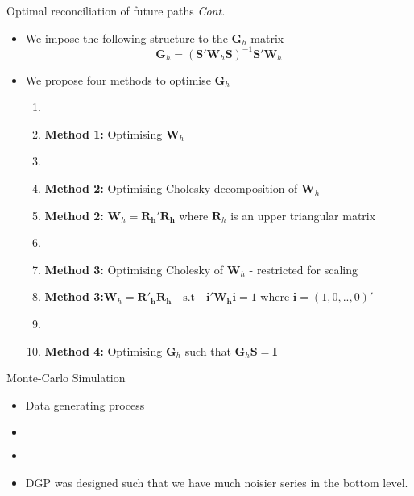 \documentclass[11pt,xcolor=dvipsnames,handout]{beamer}
\begin{document}
\begin{frame}{Optimal reconciliation of future paths \textit{Cont.}}
\begin{itemize}[<+-| alert@+>]
\item We impose the following structure to the $\bm{G}_h$ matrix
\begin{equation}\label{eq:2}
\bm{G}_h=\left(\bm{S}'\bm{W}_h\bm{S}\right)^{-1}{\bm S'}\bm{W}_h
\end{equation}
\item We propose four methods to optimise $\bm{G}_h$
\begin{enumerate}
\item[]
\item[] \textbf{\color{Maroon}Method 1:} Optimising $\bm{W}_h$
\item[] 
\item[] \textbf{\color{Maroon}Method 2:} Optimising Cholesky decomposition of $\bm{W}_h$
\item[] \textbf{\color{White}Method 2:} $\bm{W}_h=\bm{R_h'R_h}$ where $\bm{R}_h$ is an upper triangular matrix 
\item[]
\item[] \textbf{\color{Maroon}Method 3:} Optimising Cholesky of $\bm{W}_h$ - restricted for scaling
\item[] \textbf{\color{White}Method 3:}$\bm{W}_h=\bm{R'_hR_h} \quad \text{s.t} \quad \bm{i'W_hi}=1$ where $\bm{i}=(1,0,..,0)'$
\item[] 
\item[] \textbf{\color{Maroon}Method 4:} Optimising $\bm{G}_h$ such that $\bm{G}_h\bm{S=I}$

\end{enumerate}
\end{itemize}
\end{frame}


\begin{frame}{Monte-Carlo Simulation}
\begin{itemize}
\item Data generating process
\item[] 
\begin{columns}
\centering
\begin{figure}
\begin{center}
  
\qobitree
\end{center}
\end{figure}

\begin{figure}
\begin{center}
  
 
\qobitree
\end{center}
\end{figure}
\end{columns} 
\item[]
\item DGP was designed such that we have much noisier series in the bottom level.

\end{itemize}
\end{frame}
\end{document}
